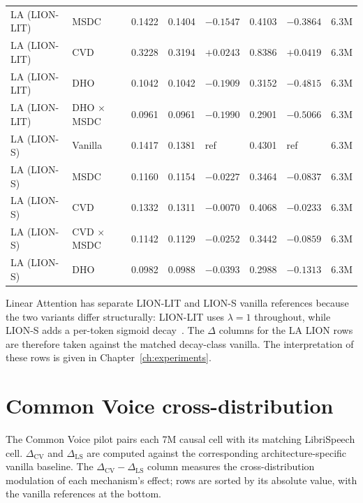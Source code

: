 \begin{table}[p]
\begin{tabularx}{\linewidth}{@{}L{2.60cm} L{2.48cm} N{1.32cm} N{1.32cm} N{1.60cm} N{1.40cm} N{1.60cm} N{0.86cm}@{}}
LA (LION-LIT)      & MSDC            & 0.1422 & 0.1404 & $-0.1547$ & 0.4103 & $-0.3864$ & 6.3M \\
LA (LION-LIT)      & CVD             & 0.3228 & 0.3194 & $+0.0243$ & 0.8386 & $+0.0419$ & 6.3M \\
LA (LION-LIT)      & DHO             & 0.1042 & 0.1042 & $-0.1909$ & 0.3152 & $-0.4815$ & 6.3M \\
LA (LION-LIT)      & DHO $\times$ MSDC & 0.0961 & 0.0961 & $-0.1990$ & 0.2901 & $-0.5066$ & 6.3M \\
\addlinespace
LA (LION-S)        & Vanilla         & 0.1417 & 0.1381 & ref       & 0.4301 & ref       & 6.3M \\
LA (LION-S)        & MSDC            & 0.1160 & 0.1154 & $-0.0227$ & 0.3464 & $-0.0837$ & 6.3M \\
LA (LION-S)        & CVD             & 0.1332 & 0.1311 & $-0.0070$ & 0.4068 & $-0.0233$ & 6.3M \\
LA (LION-S)        & CVD $\times$ MSDC & 0.1142 & 0.1129 & $-0.0252$ & 0.3442 & $-0.0859$ & 6.3M \\
LA (LION-S)        & DHO             & 0.0982 & 0.0988 & $-0.0393$ & 0.2988 & $-0.1313$ & 6.3M \\
\bottomrule
\end{tabularx}
\end{table}

Linear Attention has separate LION-LIT and LION-S vanilla
references because the two variants differ structurally: LION-LIT
uses $\lambda = 1$ throughout, while LION-S adds a per-token
sigmoid decay~\cite{afzal2025linear}. The $\Delta$ columns for the
LA LION rows are therefore taken against the matched
decay-class vanilla. The interpretation of these rows is given in
Chapter~\ref{ch:experiments}.

\section{Common Voice cross-distribution}\label{app:results:cv}

The Common Voice pilot pairs each 7M causal cell with its
matching LibriSpeech cell. $\Delta_{\mathrm{CV}}$ and
$\Delta_{\mathrm{LS}}$ are computed against the corresponding
architecture-specific vanilla baseline. The
$\Delta_{\mathrm{CV}} - \Delta_{\mathrm{LS}}$ column measures the
cross-distribution modulation of each mechanism's effect; rows
are sorted by its absolute value, with the vanilla references at
the bottom.

